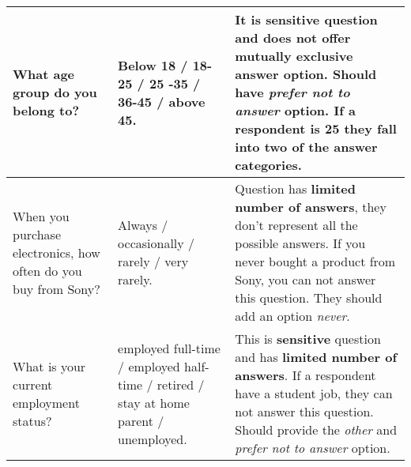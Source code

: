 \documentclass[9pt, journal,onecolumn]{IEEEtran}
\begin{document}
\begin{tabularx}{\textwidth}{X|X|X}
What age group do you belong to? \cite{sony} & Below 18 / 18-25 / 25 -35 / 36-45 / above 45. & It is \textbf{sensitive} question and \textbf{does not offer mutually exclusive answer option}. Should have \textit{prefer not to answer} option. If a respondent is 25 they fall into two of the answer categories. \\ \hline

When you purchase electronics, how often do you buy from Sony? \cite{sony} & Always / occasionally / rarely / very rarely. & Question has \textbf{limited number of answers}, they don't represent all the possible answers. If you never bought a product from Sony, you can not answer this question. They should add an option \textit{never}. \\ \hline

What is your current employment status? \cite{canada} & employed full-time / employed half-time / retired / stay at home parent / unemployed. & This is \textbf{sensitive} question and has \textbf{limited number of answers}. If a respondent have a student job, they can not answer this question. Should provide the \textit{other} and \textit{prefer not to answer} option.


\end{tabularx}








\end{document}

